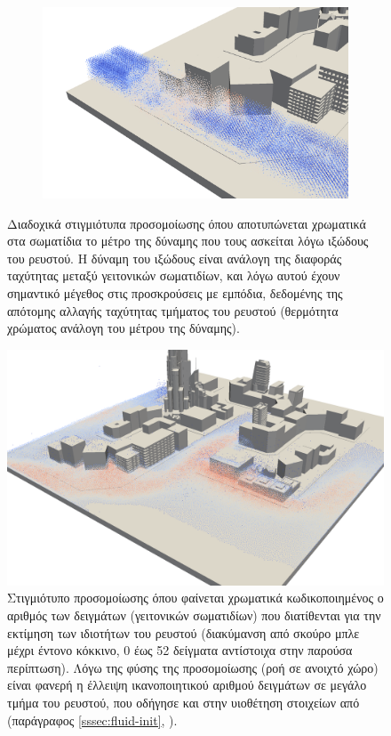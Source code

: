 \begin{figure}[h]
\begin{subfigure}{.5\textwidth}
  \end{subfigure}
  \begin{subfigure}{.5\textwidth}
    \centering
    \includegraphics[width=\textwidth]{figures/visc-3.png}
  \end{subfigure}
  \caption[Δυνάμεις ιξώδους]{Διαδοχικά στιγμιότυπα προσομοίωσης όπου αποτυπώνεται
    χρωματικά στα σωματίδια το μέτρο της δύναμης που τους ασκείται λόγω ιξώδους του
    ρευστού. Η δύναμη του ιξώδους είναι ανάλογη της διαφοράς ταχύτητας μεταξύ γειτονικών
    σωματιδίων, και λόγω αυτού έχουν σημαντικό μέγεθος στις προσκρούσεις με εμπόδια,
    δεδομένης της απότομης αλλαγής ταχύτητας τμήματος του ρευστού (θερμότητα χρώματος
    ανάλογη του μέτρου της δύναμης).}
  \label{fig:viscosity-forces}
\end{figure}

\begin{figure}[h]
  \centering
  \includegraphics[width=\textwidth]{figures/samples.png}
  \caption[Απεικόνιση γειτονικών σωματιδίων] {Στιγμιότυπο προσομοίωσης όπου φαίνεται
    χρωματικά κωδικοποιημένος ο αριθμός των δειγμάτων (γειτονικών σωματιδίων) που
    διατίθενται για την εκτίμηση των ιδιοτήτων του ρευστού (διακύμανση από σκούρο μπλε
    μέχρι έντονο κόκκινο, 0 έως 52 δείγματα αντίστοιχα στην παρούσα περίπτωση). Λόγω της
    φύσης της προσομοίωσης (ροή σε ανοιχτό χώρο) είναι φανερή η έλλειψη ικανοποιητικού
    αριθμού δειγμάτων σε μεγάλο τμήμα του ρευστού, που οδήγησε και στην υιοθέτηση
    στοιχείων από  (παράγραφος \ref{sssec:fluid-init}, \cite{Muller2007109,
      macklin2013position}).}
  \label{fig:samples}
\end{figure}


